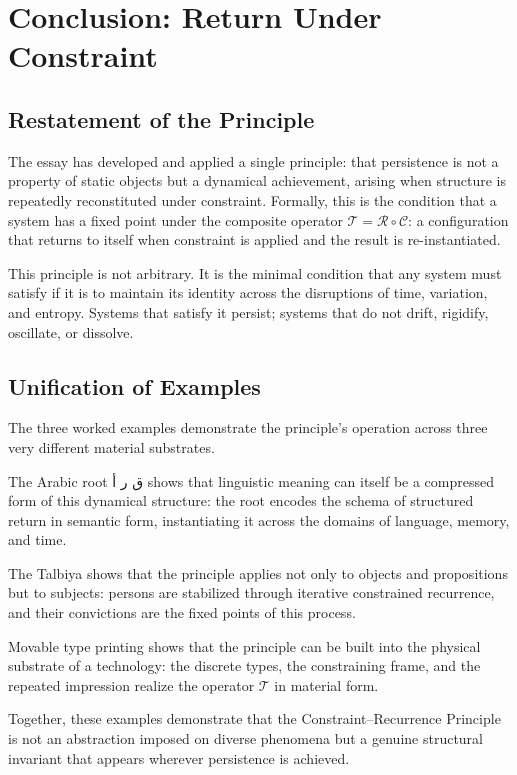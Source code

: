 \documentclass[12pt, oneside]{article}
\newcommand{\AR}[1]{\textarabic{#1}}
\theoremstyle{definition}
\theoremstyle{remark}
\begin{document}
\section{Conclusion: Return Under Constraint}

\subsection{Restatement of the Principle}

The essay has developed and applied a single principle: that persistence is not a property of static objects but a dynamical achievement, arising when structure is repeatedly reconstituted under constraint.
Formally, this is the condition that a system has a fixed point under the composite operator $\mathcal{T} = \mathcal{R} \circ \mathcal{C}$: a configuration that returns to itself when constraint is applied and the result is re-instantiated.

This principle is not arbitrary.
It is the minimal condition that any system must satisfy if it is to maintain its identity across the disruptions of time, variation, and entropy.
Systems that satisfy it persist; systems that do not drift, rigidify, oscillate, or dissolve.

\subsection{Unification of Examples}

The three worked examples demonstrate the principle's operation across three very different material substrates.

The Arabic root \AR{ق ر أ} shows that linguistic meaning can itself be a compressed form of this dynamical structure: the root encodes the schema of structured return in semantic form, instantiating it across the domains of language, memory, and time.

The Talbiya shows that the principle applies not only to objects and propositions but to subjects: persons are stabilized through iterative constrained recurrence, and their convictions are the fixed points of this process.

Movable type printing shows that the principle can be built into the physical substrate of a technology: the discrete types, the constraining frame, and the repeated impression realize the operator $\mathcal{T}$ in material form.

Together, these examples demonstrate that the Constraint--Recurrence Principle is not an abstraction imposed on diverse phenomena but a genuine structural invariant that appears wherever persistence is achieved.
\end{document}
